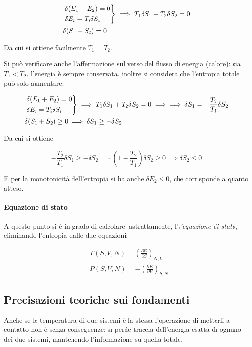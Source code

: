 \begin{align*}
&\begin{rcases*}
\delta(E_1 + E_2) = 0 \\
\delta E_i = T_i \delta S_i
\end{rcases*}
\implies T_1 \delta S_1 + T_2 \delta S_2 = 0 \\
&\delta(S_1 + S_2) = 0
\end{align*}

\noindent Da cui si ottiene facilmente $T_1 = T_2$.

Si può verificare anche l'affermazione sul verso del flusso di energia (calore): sia $T_1 < T_2$, l'energia è sempre conservata, inoltre si considera che l'entropia totale può solo aumentare:

\begin{align*}
&\begin{rcases*}
\delta(E_1 + E_2) = 0 \\
\delta E_i = T_i \delta S_i
\end{rcases*}
\implies T_1 \delta S_1 + T_2 \delta S_2 = 0 \implies \implies \delta S_1 = - \frac{T_2}{T_1} \delta S_2\\
& \delta(S_1 + S_2) \geq 0 \implies \delta S_1 \geq - \delta S_2
\end{align*}

Da cui si ottiene:

\begin{equation*}
- \frac{T_2}{T_1} \delta S_2 \geq - \delta S_2 \implies (1 - \frac{T_2}{T_1}) \delta S_2 \geq 0 \implies \delta S_2 \leq 0
\end{equation*}

E per la monotonicità dell'entropia si ha anche $\delta E_2 \leq 0$, che corrisponde a quanto atteso.

\paragraph{Equazione di stato} A questo punto si è in grado di calcolare, astrattamente, l'\textit{l'equazione di stato}, eliminando l'entropia dalle due equazioni:

\begin{align*}
	&T(S,V,N) = \left(\frac{\partial E}{\partial S}\right)_{N,V} \\
	&P(S,V,N) = - \left(\frac{\partial E}{\partial V}\right)_{S,N}
\end{align*}

\subsection{Precisazioni teoriche sui fondamenti}
\label{sec:teorpipterm}
Anche se le temperatura di due sistemi è la stessa l'operazione di metterli a contatto non è senza conseguenze: si perde traccia dell'energia esatta di ognuno dei due sistemi, mantenendo l'informazione su quella totale.


